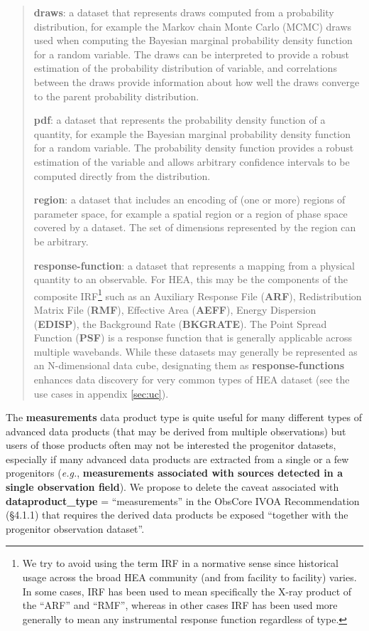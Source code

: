 \documentclass[11pt,a4paper]{ivoa}
\begin{document}
\begin{quote}
{\bf draws}: a dataset that represents draws computed from a probability distribution, for example the Markov chain Monte Carlo (MCMC) draws used when computing the Bayesian marginal probability density function for a random variable. The draws
can be interpreted to provide a robust estimation of the probability distribution of variable, and correlations between the draws provide information about how well the draws converge to the parent probability distribution.

{\bf pdf}: a dataset that represents the probability density function of a quantity, for example the Bayesian marginal probability density  function for a random variable. The probability density function provides a robust estimation of the variable and allows arbitrary confidence intervals to be computed directly from the distribution.

{\bf region}: a dataset that includes an encoding of (one or more) regions of parameter space, for example a spatial region or a region of phase space covered by a dataset. The set of dimensions represented by the region can be arbitrary.

{\bf response-function}: a dataset that represents a mapping from a physical quantity to an observable. For \gls{HEA}, this may be the components of the composite \gls{IRF}\footnote{We try to avoid using the term \gls{IRF} in a normative sense since historical usage across the broad \gls{HEA} community (and from facility to facility) varies. In some cases, \gls{IRF} has been used to mean specifically the X-ray product of the ``ARF'' and ``RMF'', whereas in other cases \gls{IRF}
has been used more generally to mean any instrumental response function regardless of type.} such as an Auxiliary Response File ({\bf ARF}), Redistribution Matrix File ({\bf RMF}), Effective Area ({\bf AEFF}), Energy Dispersion ({\bf EDISP}), the Background Rate ({\bf BKGRATE}). The Point Spread Function ({\bf PSF}) is a response function that is generally applicable across multiple wavebands. While these datasets may generally be represented as an N-dimensional data cube, designating them as {\bf response-functions} enhances data discovery for very common types of \gls{HEA} dataset (see the use cases in appendix \ref{sec:uc}).

\end{quote}


The {\bf measurements} data product type is quite useful for many different types of advanced data products (that may be derived from multiple observations) but users of those products often may not be interested the progenitor datasets, especially if many advanced data products are extracted from a single or a few progenitors ({\em e.g.\/}, {\bf measurements associated with sources detected in a single observation field}). We propose to delete the caveat associated with {\bf dataproduct\_type} = ``measurements'' in the ObsCore IVOA Recommendation (\S4.1.1) that requires the derived data products be exposed ``together with the progenitor observation dataset''.\\
\end{document}
